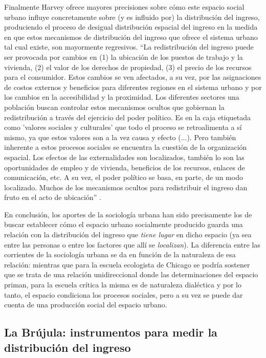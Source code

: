 Finalmente Harvey ofrece mayores precisiones sobre cómo este espacio social urbano influye concretamente sobre (y es influido por) la distribución del ingreso, produciendo el proceso de desigual distribución espacial del ingreso en la medida en que estos mecanismos de distribución del ingreso que ofrece el sistema urbano tal cual existe, son mayormente regresivos. “La redistribución del ingreso puede ser provocada por cambios en (1) la ubicación de los puestos de trabajo y la vivienda, (2) el valor de los derechos de propiedad, (3) el precio de los recursos para el consumidor. Estos cambios se ven afectados, a su vez, por las asignaciones de costos externos y beneficios para diferentes regiones en el sistema urbano y por los cambios en la accesibilidad y la proximidad. Los diferentes sectores una población buscan controlar estos mecanismos ocultos que gobiernan la redistribución a través del ejercicio del poder político. Es en la caja etiquetada como 'valores sociales y culturales' que todo el proceso se retroalimenta a sí mismo, ya que estos valores son a la vez causa y efecto (...). Pero también inherente a estos procesos sociales se encuentra la cuestión de la organización espacial. Los efectos de las externalidades son localizados, también lo son las oportunidades de empleo y de vivienda, beneficios de los recursos, enlaces de comunicación, etc. A su vez, el poder político se basa, en parte, de un modo localizado. Muchos de los mecanismos ocultos para redistribuir el ingreso dan fruto en el acto de ubicación” \cite[~86]{harvey}.

En conclusión, los aportes de la sociología urbana han sido precisamente los de buscar establecer cómo el espacio urbano socialmente producido guarda una relación con la distribución del ingreso que \textit{tiene lugar} en dicho espacio (ya sea entre las personas o entre los factores que allí se \textit{localizan}). La diferencia entre las corrientes de la sociología urbana se da en función de la naturaleza de esa relación: mientras que para la escuela ecologista de Chicago \cite{park,burgess1928,mckenzie,wirth} se podría sostener que se trata de una relación unidireccional donde las determinaciones del espacio priman, para la escuela crítica \cite{lefebvre,castells,harvey} la misma es de naturaleza dialéctica y por lo tanto, el espacio condiciona los procesos sociales, pero a su vez se puede dar cuenta de una producción social del espacio urbano.

\subsection{La Brújula: instrumentos para medir la distribución del ingreso}
	
